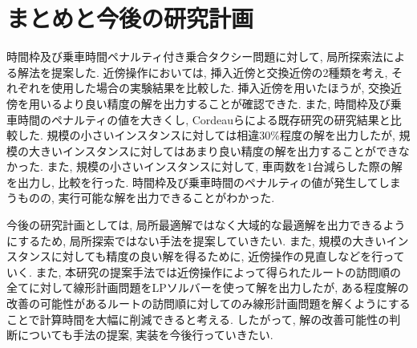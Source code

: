 \chapter{まとめと今後の研究計画}\label{conclution}
時間枠及び乗車時間ペナルティ付き乗合タクシー問題に対して, 局所探索法による解法を提案した. 近傍操作においては, 挿入近傍と交換近傍の2種類を考え, それぞれを使用した場合の実験結果を比較した. 挿入近傍を用いたほうが, 交換近傍を用いるより良い精度の解を出力することが確認できた.
また, 時間枠及び乗車時間のペナルティの値を大きくし, Cordeauらによる既存研究の研究結果と比較した. 規模の小さいインスタンスに対しては相違30\%程度の解を出力したが, 規模の大きいインスタンスに対してはあまり良い精度の解を出力することができなかった.
また, 規模の小さいインスタンスに対して, 車両数を1台減らした際の解を出力し, 比較を行った. 時間枠及び乗車時間のペナルティの値が発生してしまうものの, 実行可能な解を出力できることがわかった. 

今後の研究計画としては, 局所最適解ではなく大域的な最適解を出力できるようにするため, 局所探索ではない手法を提案していきたい.
また, 規模の大きいインスタンスに対しても精度の良い解を得るために, 近傍操作の見直しなどを行っていく.
また, 本研究の提案手法では近傍操作によって得られたルートの訪問順の全てに対して線形計画問題をLPソルバーを使って解を出力したが, ある程度解の改善の可能性があるルートの訪問順に対してのみ線形計画問題を解くようにすることで計算時間を大幅に削減できると考える. したがって, 解の改善可能性の判断についても手法の提案, 実装を今後行っていきたい.
